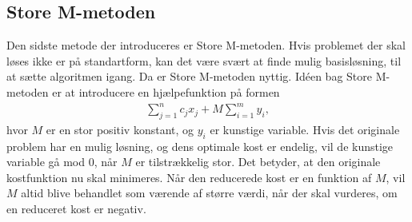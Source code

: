 \subsection{Store M-metoden}

Den sidste metode der introduceres er Store M-metoden. 
Hvis problemet der skal løses ikke er på standartform, kan det være svært at finde mulig basisløsning, til at sætte algoritmen igang. Da er Store M-metoden nyttig.
Idéen bag Store M-metoden er at introducere en hjælpefunktion på formen
\begin{align*}
\sum\limits_{j=1}^n c_jx_j + M \sum\limits_{i=1}^m y_i,
\end{align*}
hvor $M$ er en stor positiv konstant, og $y_i$ er kunstige variable. 
Hvis det originale problem har en mulig løsning, og dens optimale kost er endelig, vil de kunstige variable gå mod $0$, når $M$ er tilstrækkelig stor. 
Det betyder, at den originale kostfunktion nu skal minimeres. 
Når den reducerede kost er en funktion af $M$, vil $M$ altid blive behandlet som værende af større værdi, når der skal vurderes, om en reduceret kost er negativ. \\

